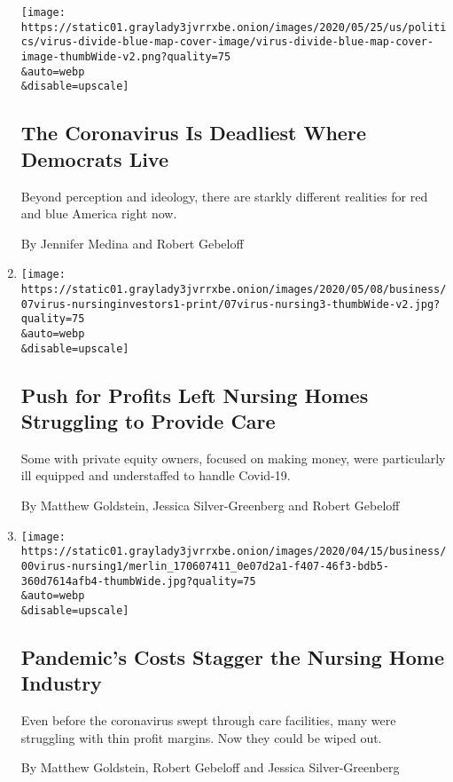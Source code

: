 \begin{enumerate}
  \texttt{[image: https://static01.graylady3jvrrxbe.onion/images/2020/05/25/us/politics/virus-divide-blue-map-cover-image/virus-divide-blue-map-cover-image-thumbWide-v2.png?quality=75\\\&auto=webp\\\&disable=upscale]}

  \hypertarget{the-coronavirus-is-deadliest-where-democrats-live}{%
  \subsection{The Coronavirus Is Deadliest Where Democrats
  Live}\label{the-coronavirus-is-deadliest-where-democrats-live}}

  Beyond perception and ideology, there are starkly different realities
  for red and blue America right now.

  By Jennifer Medina and Robert Gebeloff
\item
  \href{/2020/05/07/business/coronavirus-nursing-homes.html}{}

  \texttt{[image: https://static01.graylady3jvrrxbe.onion/images/2020/05/08/business/07virus-nursinginvestors1-print/07virus-nursing3-thumbWide-v2.jpg?quality=75\\\&auto=webp\\\&disable=upscale]}

  \hypertarget{push-for-profits-left-nursing-homes-struggling-to-provide-care}{%
  \subsection{Push for Profits Left Nursing Homes Struggling to Provide
  Care}\label{push-for-profits-left-nursing-homes-struggling-to-provide-care}}

  Some with private equity owners, focused on making money, were
  particularly ill equipped and understaffed to handle Covid-19.

  By Matthew Goldstein, Jessica Silver-Greenberg and Robert Gebeloff
\item
  \href{/2020/04/21/business/coronavirus-nursing-home-finances.html}{}

  \texttt{[image: https://static01.graylady3jvrrxbe.onion/images/2020/04/15/business/00virus-nursing1/merlin\_170607411\_0e07d2a1-f407-46f3-bdb5-360d7614afb4-thumbWide.jpg?quality=75\\\&auto=webp\\\&disable=upscale]}

  \hypertarget{pandemics-costs-stagger-the-nursing-home-industry}{%
  \subsection{Pandemic's Costs Stagger the Nursing Home
  Industry}\label{pandemics-costs-stagger-the-nursing-home-industry}}

  Even before the coronavirus swept through care facilities, many were
  struggling with thin profit margins. Now they could be wiped out.

  By Matthew Goldstein, Robert Gebeloff and Jessica Silver-Greenberg
\end{enumerate}

